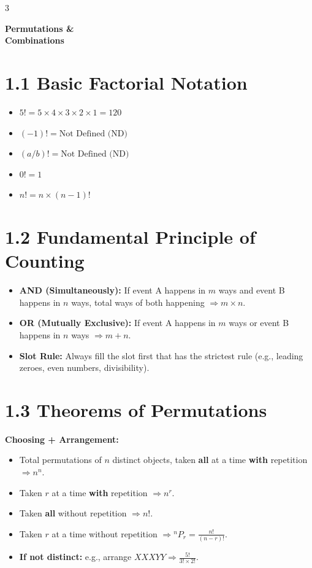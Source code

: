 \documentclass[11pt,a4paper,landscape]{article}
\begin{document}
\newpage
\begin{multicols*}{3}

\textbf{\Huge Permutations \& \\ Combinations}

\section*{1.1 Basic Factorial Notation}
\begin{itemize}
\item $5! = 5 \times 4 \times 3 \times 2 \times 1 = 120$
\item $(-1)! = \text{Not Defined (ND)}$
\item $(a/b)! = \text{Not Defined (ND)}$
\item $0! = 1$
\item $n! = n \times (n-1)!$
\end{itemize}

\section*{1.2 Fundamental Principle of Counting}
\begin{itemize}
\item \textbf{AND (Simultaneously):} If event A happens in $m$ ways and event B happens in $n$ ways, total ways of both happening $\Rightarrow m \times n$.
\item \textbf{OR (Mutually Exclusive):} If event A happens in $m$ ways or event B happens in $n$ ways $\Rightarrow m + n$.
\item \textbf{Slot Rule:} Always fill the slot first that has the strictest rule (e.g., leading zeroes, even numbers, divisibility).
\end{itemize}

\section*{1.3 Theorems of Permutations}
\textbf{Choosing + Arrangement:}
\begin{itemize}
\item Total permutations of $n$ distinct objects, taken \textbf{all} at a time \textbf{with} repetition $\Rightarrow n^n$.
\item Taken \textbf{$r$} at a time \textbf{with} repetition $\Rightarrow n^r$.
\item Taken \textbf{all} without repetition $\Rightarrow n!$.
\item Taken \textbf{$r$} at a time without repetition $\Rightarrow {}^nP_r = \frac{n!}{(n-r)!}$.
\item \textbf{If not distinct:} e.g., arrange $XXXYY \Rightarrow \frac{5!}{3! \times 2!}$.
\end{itemize}


\end{multicols*}
\end{document}
